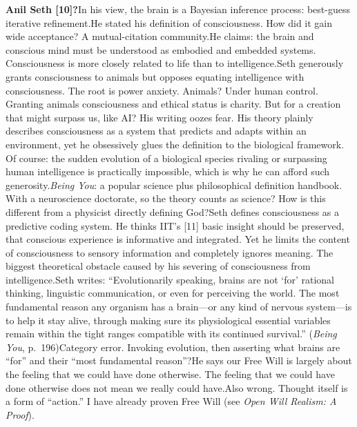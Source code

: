 \documentclass[11pt]{article}
\renewcommand{\\}[1][\mynewlineskip]{\oldnewline[#1]}
\begin{document}
\vspace{1em}
\textbf{Anil Seth [10]?}\\
In his view, the brain is a Bayesian inference process: best-guess iterative refinement.\\
He stated his definition of consciousness. How did it gain wide acceptance? A mutual-citation community.\\
He claims: the brain and conscious mind must be understood as embodied and embedded systems. Consciousness is more closely related to life than to intelligence.\\
Seth generously grants consciousness to animals but opposes equating intelligence with consciousness. The root is power anxiety. Animals? Under human control. Granting animals consciousness and ethical status is charity. But for a creation that might surpass us, like AI? His writing oozes fear. His theory plainly describes consciousness as a system that predicts and adapts within an environment, yet he obsessively glues the definition to the biological framework. Of course: the sudden evolution of a biological species rivaling or surpassing human intelligence is practically impossible, which is why he can afford such generosity.\\
\textit{Being You}: a popular science plus philosophical definition handbook. With a neuroscience doctorate, so the theory counts as science? How is this different from a physicist directly defining God?\\
Seth defines consciousness as a predictive coding system. He thinks IIT's [11] basic insight should be preserved, that conscious experience is informative and integrated. Yet he limits the content of consciousness to sensory information and completely ignores meaning. The biggest theoretical obstacle caused by his severing of consciousness from intelligence.\\
Seth writes: ``Evolutionarily speaking, brains are not `for' rational thinking, linguistic communication, or even for perceiving the world. The most fundamental reason any organism has a brain---or any kind of nervous system---is to help it stay alive, through making sure its physiological essential variables remain within the tight ranges compatible with its continued survival.'' (\textit{Being You}, p.\ 196)\\
Category error. Invoking evolution, then asserting what brains are ``for'' and their ``most fundamental reason''?\\
He says our Free Will is largely about the feeling that we could have done otherwise. The feeling that we could have done otherwise does not mean we really could have.\\
Also wrong. Thought itself is a form of ``action.'' I have already proven Free Will (see \textit{Open Will Realism: A Proof}).
\end{document}
